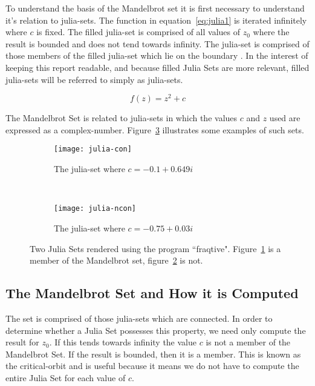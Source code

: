 To understand the basis of the Mandelbrot set it is first necessary to understand it's relation to julia-sets.
The function in equation~\ref{eq:julia1} is iterated infinitely where \(c\) is fixed.
The filled julia-set is comprised of all values of \(z_0\) where the result is bounded and does not tend towards infinity.
The julia-set is comprised of those members of the filled julia-set which lie on the boundary \cite{chaosfract}.
In the interest of keeping this report readable, and because filled Julia Sets are more relevant, filled julia-sets will be 
referred to simply as julia-sets.

\begin{equation}\label{eq:julia1}
f(z) = z^2 + c
\end{equation}

The Mandelbrot Set is related to julia-sets in which the values \(c\) and \(z\) used are expressed as a 
\gls{complex-number}. Figure~\ref{fig:juliaimgs} illustrates some examples of such sets. 

\begin{figure}[h]
\centering
\begin{subfigure}[b]{0.48\textwidth}
  \centering    
  \texttt{[image: julia-con]}
  \caption{
    \tiny The julia-set where \(c = -0.1 + 0.649i\)
  }
  \label{fig:juliaimgcon}
\end{subfigure}
~ %
\begin{subfigure}[b]{0.48\textwidth}
  \centering
  \texttt{[image: julia-ncon]}
  \caption{
    \tiny The julia-set where \(c = -0.75 + 0.03i\)
  }
  \label{fig:juliaimgncon}
\end{subfigure}
\caption{
  Two Julia Sets rendered using the program ``fraqtive"\cite{fraqtive}. 
  Figure~\ref{fig:juliaimgcon} is a member of the Mandelbrot set, 
  figure~\ref{fig:juliaimgncon} is not.
}
\label{fig:juliaimgs}
\end{figure}

\subsection*{The Mandelbrot Set and How it is Computed}

The set is comprised of those julia-sets which are connected. In order to determine whether a Julia Set possesses this property,
we need only compute the result for \(z_0\). If this tends towards infinity the value \(c\) is not a member of the Mandelbrot Set. If the result
is bounded, then it is a member. This is known as the \gls{critical-orbit} and is useful because it means we do not have to compute
the entire Julia Set for each value of \(c\).

